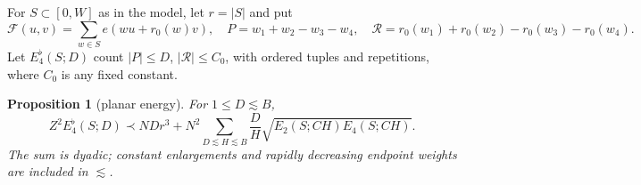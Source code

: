 \documentclass[11pt]{amsart}
\numberwithin{equation}{section}
\newtheorem{proposition}[theorem]{Proposition}
\begin{document}
For $S\subset[0,W]$ as in the model, let $r=|S|$ and put
\[
 \mathcal F(u,v)=\sum_{w\in S}e(wu+r_0(w)v),\quad
 P=w_1+w_2-w_3-w_4,\quad \mathcal R=r_0(w_1)+r_0(w_2)-r_0(w_3)-r_0(w_4).
\]
Let $E_4^\flat(S;D)$ count $|P|\le D$, $|\mathcal R|\le C_0$, with
ordered tuples and repetitions, where $C_0$ is any fixed constant.

\begin{proposition}[planar energy]
\label{prop:planarreproof}
For $1\le D\lesssim B$,
\begin{equation}\label{eq:planarenergy}
 Z^2 E_4^\flat(S;D)\prec NDr^3+
 N^2\sum_{D\lesssim H\lesssim B}\frac DH
             \sqrt{E_2(S;CH)E_4(S;CH)}.
\end{equation}
The sum is dyadic; constant enlargements and rapidly decreasing
endpoint weights are included in $\lesssim$.
\end{proposition}
\end{document}
